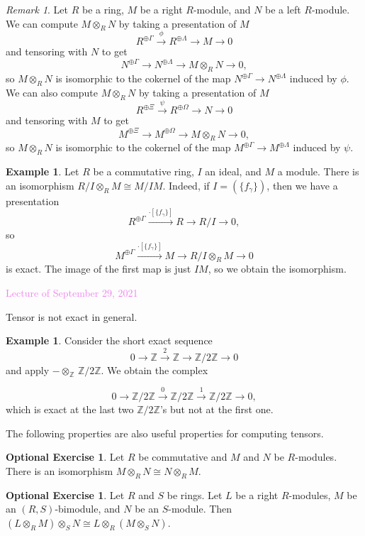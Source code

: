 \documentclass{amsart}[12pt]
\newcommand{\Sept}[1]{\textcolor{violet}{Lecture of September #1, 2021}}
\newcommand{\Z}{\mathbb{Z}}
\numberwithin{equation}{section}
\theoremstyle{plain} %
\theoremstyle{definition}
\newtheorem{ex}[equation]{Example}
\newtheorem{exer}[equation]{Optional Exercise}
\theoremstyle{remark}
\newtheorem{rem}[equation]{Remark}
\newcommand{\xra}[1]{\xrightarrow{#1}}
\begin{document}
\begin{rem}
Let $R$ be a ring, $M$ be a right $R$-module, and $N$ be a left $R$-module. We can compute $M\otimes_R N$ by taking a presentation of $M$
\[ R^{\oplus \Gamma} \xra {\phi} R^{\oplus \Lambda} \to M \to 0\]
and tensoring with $N$ to get
\[ N^{\oplus \Gamma} \xra{} N^{\oplus \Lambda} \to M \otimes_R N \to 0,\]
so $M\otimes_R N$ is isomorphic to the cokernel of the map $N^{\oplus \Gamma} \to N^{\oplus \Lambda}$ induced by $\phi$. We can also compute $M\otimes_R N$ by taking a presentation of $M$
\[ R^{\oplus \Xi} \xra {\psi} R^{\oplus \Omega} \to N \to 0\]
and tensoring with $M$ to get
\[ M^{\oplus \Xi} \xra{} M^{\oplus \Omega} \to M \otimes_R N \to 0,\]
so $M\otimes_R N$ is isomorphic to the cokernel of the map $M^{\oplus \Gamma} \to M^{\oplus \Lambda}$ induced by $\psi$. 
\end{rem}

\begin{ex}
Let $R$ be a commutative ring, $I$ an ideal, and $M$ a module. There is an isomorphism
$R/I \otimes_R M \cong M/IM$. Indeed, if $I=(\{f_\gamma\})$, then we have a presentation
\[ R^{\oplus \Gamma} \xra{\cdot [ \{f_\gamma\} ] } R \to R/I \to 0,\]
so
\[ M^{\oplus \Gamma} \xra{\cdot [ \{f_\gamma\} ] } M \to R/I \otimes_R M \to 0\]
is exact. The image of the first map is just $IM$, so we obtain the isomorphism.
\end{ex}

\Sept{29}


Tensor is not exact in general.

\begin{ex} Consider the short exact sequence 
\[ 0 \to \Z \xra{2} \Z \to \Z/2\Z \to 0\] and apply $-\otimes_{\Z} \,\Z/2\Z$. We obtain the complex

\[ 0 \to \Z/2\Z \xra{0} \Z/2\Z \xra{1} \Z/2\Z \to 0,\]
which is exact at the last two $\Z/2\Z$'s but not at the first one.
\end{ex}

The following properties are also useful properties for computing tensors.

\begin{exer} Let $R$ be commutative and $M$ and $N$ be $R$-modules. There is an isomorphism $M\otimes_R N \cong N \otimes_R M$.
\end{exer}

\begin{exer} Let $R$ and $S$ be rings. Let $L$ be a right $R$-modules, $M$ be an $(R,S)$-bimodule, and $N$ be an $S$-module. Then $(L\otimes_R M) \otimes_S N \cong L \otimes_R (M\otimes_S N)$.
\end{exer}
\end{document}
